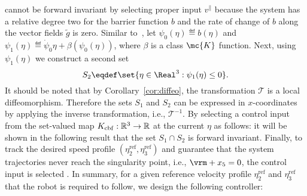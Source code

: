 {{\begin{equation}
\end{equation} cannot be forward invariant by selecting proper input $v^\parallel$ because the system has a relative degree two for the barrier function $b$ and the rate of change of $b$ along the vector fields $\tilde g$ is zero. Similar to~\cite{XiaBelCas2022}, let $\psi_0(\eta) \eqdef b(\eta)$ and $\psi_1(\eta) \eqdef \dot\psi_0{\eta} + \beta(\psi_0(\eta))$, where $\beta$ is a class $\mc{K}$ function. Next, using $\psi_1(\eta)$
we construct a second set 
\begin{equation}
\label{eq:set-S2}
S_2 \eqdef \set{ \eta \in \Real^3 : \psi_1(\eta) \leq 0}.   
\end{equation}
It should be noted that by Corollary~\ref{cor:diffeo}, the transformation $\mathscr{T}$ is a local diffeomorphism. Therefore the sets $S_1$ and $S_2$ can be expressed in $x$-coordinates by applying the inverse transformation, i.e., $\mathscr{T}^{-1}$.
%
By selecting a control input from the set-valued map $K_{\mathrm{cbf}}: \mathbb{R}^{3}\to \mathbb{R}$  at the current $\eta$ as follows:
it will be shown in the following result that the set $S_1 \cap S_2$ is forward invariant.} Finally, to track the desired speed profile $({\eta}^{\mathrm{ref}}_{2}, \eta^{\mathrm{ref}}_{3})$ and guarantee that the system trajectories never reach the singularity point, i.e., $\vrm + x_5  = 0$, the control input is selected 
. In summary, for a given reference velocity profile ${\eta}^{\mathrm{ref}}_{2}$ and $ \eta^{\mathrm{ref}}_{3}$ that the robot is required to follow, we design the following controller:
}
